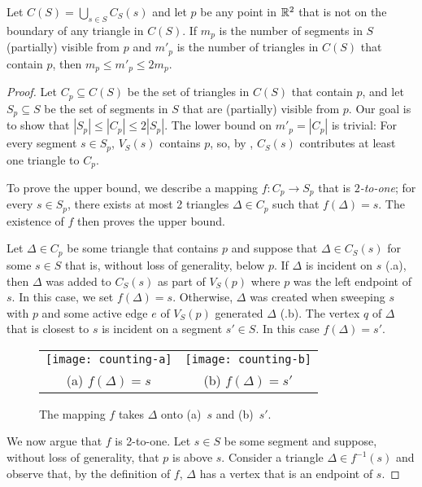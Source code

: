 \documentclass{patmorin}
\begin{document}
\begin{lem}
Let $C(S)=\bigcup_{s\in S} C_S(s)$ and let $p$ be any point in $\mathbb{R}^2$ that
is not on the boundary of any triangle in $C(S)$.  If $m_p$ is the number
of segments in $S$ (partially) visible from $p$ and $m'_p$ is the number
of triangles in $C(S)$ that contain $p$, then $m_p \le m'_p \le 2m_p$.
\end{lem}

\begin{proof}
Let $C_p\subseteq C(S)$ be the set of triangles in $C(S)$ that contain
$p$, and let $S_p\subseteq S$ be the set of segments in $S$ that are
(partially) visible from $p$.  Our goal is to show that $|S_p|\le |C_p|\le
2|S_p|$. The lower bound on $m'_p=|C_p|$ is trivial: For every segment
$s\in S_p$, $V_S(s)$ contains $p$, so, by , $C_S(s)$
contributes at least one triangle to $C_p$.

To prove the upper bound, we describe a mapping $f: C_p \rightarrow S_p$
that is \emph{$2$-to-one}; for every $s\in S_p$, there exists at most 2
triangles $\Delta\in C_p$ such that $f(\Delta)=s$. The existence of $f$
then proves the upper bound.

Let $\Delta\in C_p$ be some triangle that contains $p$ and suppose that
$\Delta\in C_S(s)$ for some $s\in S$ that is, without loss of generality,
below $p$.  If $\Delta$ is incident on $s$ (.a), then $\Delta$ was added to
$C_S(s)$ as part of $V_S(p)$ where $p$ was the left endpoint of $s$.  In
this case, we set $f(\Delta)=s$.  Otherwise, $\Delta$ was created when
sweeping $s$ with $p$ and some active edge $e$ of $V_S(p)$ generated
$\Delta$ (.b).  The vertex $q$ of $\Delta$ that is closest to $s$ is incident on a
segment $s'\in S$.  In this case $f(\Delta)=s'$.

\begin{figure}
  \begin{center}
    \begin{tabular}{cc}
      \texttt{[image: counting-a]} &
      \texttt{[image: counting-b]} \\
      (a) $f(\Delta)=s$ & (b) $f(\Delta)=s'$
    \end{tabular}
  \end{center}
  \caption{The mapping $f$ takes $\Delta$ onto (a)~$s$ and (b)~$s'$.}
\end{figure}

We now argue that $f$ is 2-to-one.  Let $s\in S$ be some segment and
suppose, without loss of generality, that $p$ is above $s$.  Consider a
triangle $\Delta \in f^{-1}(s)$ and observe that, by the definition of $f$,
$\Delta$ has a vertex that is an endpoint of $s$.


\end{proof}
\end{document}
